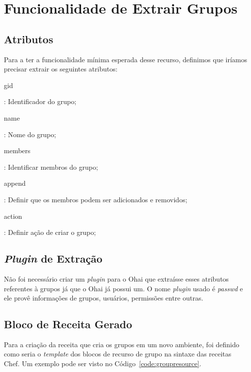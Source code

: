 \section{Funcionalidade de Extrair Grupos}
\label{sec:groups}

\subsection{Atributos}

Para a ter a funcionalidade mínima esperada desse recurso, definimos que iríamos precisar
extrair os seguintes atributos:

\begin{itemize}
    {\itshape\item gid}: Identificador do grupo;
    {\itshape\item name}: Nome do grupo;
    {\itshape\item members}: Identificar membros do grupo;
\end{itemize}


\begin{itemize}
    {\itshape\item append}: Definir que os membros podem ser adicionados e removidos;
    {\itshape\item action}: Definir ação de criar o grupo;
\end{itemize}

\subsection{\textit{Plugin} de Extração}
Não foi necessário criar um \textit{plugin} para o Ohai que extraísse esses atributos
referentes à grupos já que o Ohai já possui um. O nome \textit{plugin} usado é 
\textit{passwd} e ele provê informações de grupos, usuários, permissões entre outras.

\subsection{Bloco de Receita Gerado}

Para a criação da receita que cria os grupos em um novo ambiente, foi definido
como seria o \textit{template} dos blocos de recurso de grupo na sintaxe das receitas Chef.
Um exemplo pode ser visto no Código~\ref{code:groupresource}.

\noindent\begin{minipage}{\textwidth}
  \lstset{style=shell}
  
\end{minipage}\hfill

